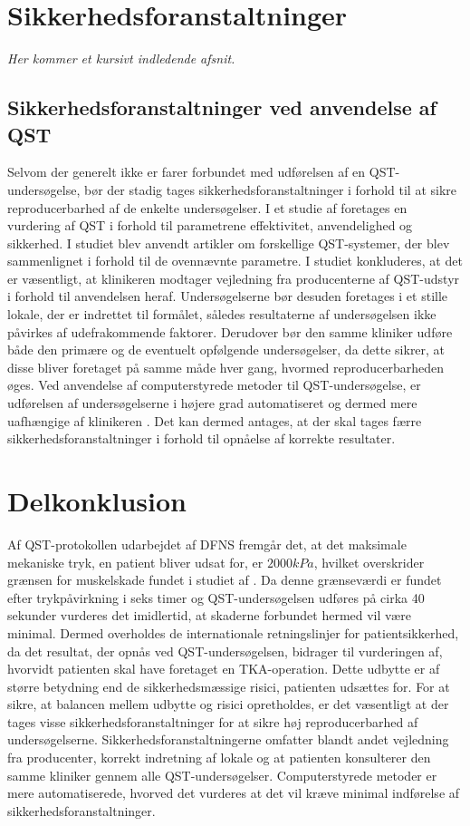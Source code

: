 \section{Sikkerhedsforanstaltninger}
\textit{Her kommer et kursivt indledende afsnit.}
\subsection{Sikkerhedsforanstaltninger ved anvendelse af QST}
Selvom der generelt ikke er farer forbundet med udførelsen af en QST-undersøgelse, bør der stadig tages sikkerhedsforanstaltninger i forhold til at sikre reproducerbarhed af de enkelte undersøgelser. I et studie af  foretages en vurdering af QST i forhold til parametrene effektivitet, anvendelighed og sikkerhed. I studiet blev anvendt artikler om forskellige QST-systemer, der blev sammenlignet i forhold til de ovennævnte parametre. I studiet konkluderes, at det er væsentligt, at klinikeren modtager vejledning fra producenterne af QST-udstyr i forhold til anvendelsen heraf. Undersøgelserne bør desuden foretages i et stille lokale, der er indrettet til formålet, således resultaterne af undersøgelsen ikke påvirkes af udefrakommende faktorer. Derudover bør den samme kliniker udføre både den primære og de eventuelt opfølgende undersøgelser, da dette sikrer, at disse bliver foretaget på samme måde hver gang, hvormed reproducerbarheden øges. \citep{shy2003}
Ved anvendelse af computerstyrede metoder til QST-undersøgelse, er udførelsen af undersøgelserne i højere grad automatiseret og dermed mere uafhængige af klinikeren \citep{Nielsen2015}. Det kan dermed antages, at der skal tages færre sikkerhedsforanstaltninger i forhold til opnåelse af korrekte resultater.  

\section{Delkonklusion}
Af QST-protokollen udarbejdet af DFNS fremgår det, at det maksimale mekaniske tryk, en patient bliver udsat for, er $2000 kPa$, hvilket overskrider grænsen for muskelskade fundet i studiet af . Da denne grænseværdi er fundet efter trykpåvirkning i seks timer og QST-undersøgelsen udføres på cirka 40 sekunder vurderes det imidlertid, at skaderne forbundet hermed vil være minimal. Dermed overholdes de internationale retningslinjer for patientsikkerhed, da det resultat, der opnås ved QST-undersøgelsen, bidrager til vurderingen af, hvorvidt patienten skal have foretaget en TKA-operation. Dette udbytte er af større betydning end de sikkerhedsmæssige risici, patienten udsættes for.
For at sikre, at balancen mellem udbytte og risici opretholdes, er det væsentligt at der tages visse sikkerhedsforanstaltninger for at sikre høj reproducerbarhed af undersøgelserne. Sikkerhedsforanstaltningerne omfatter blandt andet vejledning fra producenter, korrekt indretning af lokale og at patienten konsulterer den samme kliniker gennem alle QST-undersøgelser. Computerstyrede metoder er mere automatiserede, hvorved det vurderes at det vil kræve minimal indførelse af sikkerhedsforanstaltninger.



